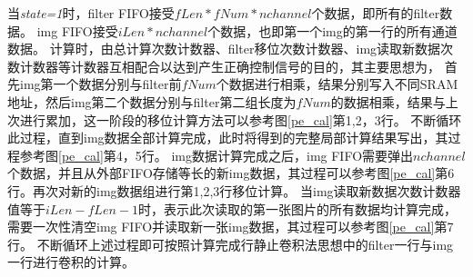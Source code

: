 当\emph{state=1}时，filter FIFO接受$fLen*fNum*nchannel$个数据，即所有的filter数据。
img FIFO接受$iLen*nchannel$个数据，也即第一个img的第一行的所有通道数据。
计算时，由总计算次数计数器、filter移位次数计数器、img读取新数据次数计数器等计数器互相配合以达到产生正确控制信号的目的，其主要思想为，
首先img第一个数据分别与filter前$fNum$个数据进行相乘，结果分别写入不同SRAM地址，然后img第二个数据分别与filter第二组长度为$fNum$的数据相乘，结果与上次进行累加，这一阶段的移位计算方法可以参考图\ref{pe_cal}第1,2，3行。
不断循环此过程，直到img数据全部计算完成，此时将得到的完整局部计算结果写出，其过程参考图\ref{pe_cal}第4，5行。
img数据计算完成之后，img FIFO需要弹出$nchannel$个数据，并且从外部FIFO存储等长的新img数据，其过程可以参考图\ref{pe_cal}第6行。再次对新的img数据组进行第1,2,3行移位计算。
当img读取新数据次数计数器值等于$iLen - fLen - 1$时，表示此次读取的第一张图片的所有数据均计算完成，需要一次性清空img FIFO并读取新一张img数据，其过程可以参考图\ref{pe_cal}第7行。
不断循环上述过程即可按照计算完成行静止卷积法思想中的filter一行与img一行进行卷积的计算。



